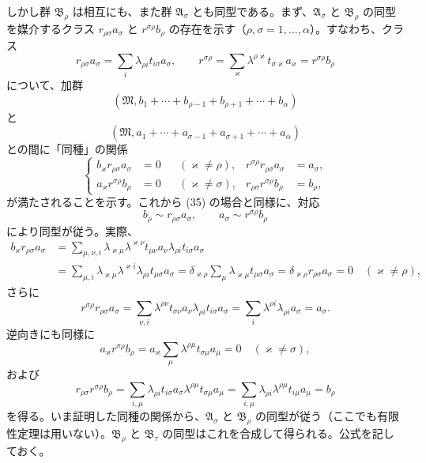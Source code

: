 \documentclass[11pt]{article}
\begin{document}
しかし群 $\mathfrak B_\rho$ は相互にも、また群 $\mathfrak A_\sigma$ とも同型である。まず、$\mathfrak A_\sigma$ と $\mathfrak B_\rho$ の同型を媒介するクラス $r_{\rho\sigma}a_\sigma$ と $r^{\sigma\rho}b_\rho$ の存在を示す（$\rho,\sigma=1,\ldots,\alpha$）。すなわち、クラス
\[
 r_{\rho\sigma}a_\sigma=\sum_i\lambda_{\rho i}t_{i\sigma}a_\sigma,
 \qquad
 r^{\sigma\rho}=\sum_\varkappa\lambda^{\rho\varkappa}t_{\sigma\varkappa}a_\varkappa
 =r^{\sigma\rho}b_\rho
\]
について、加群
\[
 (\mathfrak M,b_1+\cdots+b_{\rho-1}+b_{\rho+1}+\cdots+b_\alpha)
\]
と
\[
 (\mathfrak M,a_1+\cdots+a_{\sigma-1}+a_{\sigma+1}+\cdots+a_\alpha)
\]
との間に「同種」の関係
\begin{equation}
\left\{
\begin{aligned}
 b_\varkappa r_{\rho\sigma}a_\sigma&=0 &&(\varkappa\ne\rho),&
 r^{\sigma\rho}r_{\rho\sigma}a_\sigma&=a_\sigma,\\
 a_\varkappa r^{\sigma\rho}b_\rho&=0 &&(\varkappa\ne\sigma),&
 r_{\rho\sigma}r^{\sigma\rho}b_\rho&=b_\rho,
\end{aligned}\right.
\tag{39}
\end{equation}
が満たされることを示す。これから (35) の場合と同様に、対応
\begin{equation}
 b_\rho\sim r_{\rho\sigma}a_\sigma,
 \qquad
 a_\sigma\sim r^{\sigma\rho}b_\rho
\tag{40}
\end{equation}
により同型が従う。実際、
\[
\begin{aligned}
 b_\varkappa r_{\rho\sigma}a_\sigma
 &=\sum_{\mu,\nu,i}\lambda_{\varkappa\mu}\lambda^{\varkappa\nu}t_{\mu\nu}a_\nu\lambda_{\rho i}t_{i\sigma}a_\sigma\\
 &=\sum_{\mu,i}\lambda_{\varkappa\mu}\lambda^{\varkappa i}\lambda_{\rho i}t_{\mu\sigma}a_\sigma
 =\delta_{\varkappa\rho}\sum_\mu\lambda_{\varkappa\mu}t_{\mu\sigma}a_\sigma
 =\delta_{\varkappa\rho}r_{\rho\sigma}a_\sigma=0\quad(\varkappa\ne\rho),
\end{aligned}
\]
さらに
\[
 r^{\sigma\rho}r_{\rho\sigma}a_\sigma
 =\sum_{\nu,i}\lambda^{\rho\nu}t_{\sigma\nu}a_\nu\lambda_{\rho i}t_{i\sigma}a_\sigma
 =\sum_i\lambda^{\rho i}\lambda_{\rho i}a_\sigma=a_\sigma.
\]
逆向きにも同様に
\[
 a_\varkappa r^{\sigma\rho}b_\rho
 =a_\varkappa\sum_\mu\lambda^{\rho\mu}t_{\sigma\mu}a_\mu=0
 \quad(\varkappa\ne\sigma),
\]
および
\[
 r_{\rho\sigma}r^{\sigma\rho}b_\rho
 =\sum_{i,\mu}\lambda_{\rho i}t_{i\sigma}a_\sigma\lambda^{\rho\mu}t_{\sigma\mu}a_\mu
 =\sum_{i,\mu}\lambda_{\rho i}\lambda^{\rho\mu}t_{i\mu}a_\mu=b_\rho
\]
を得る。いま証明した同種の関係から、$\mathfrak A_\sigma$ と $\mathfrak B_\rho$ の同型が従う（ここでも有限性定理は用いない）。$\mathfrak B_\rho$ と $\mathfrak B_\tau$ の同型はこれを合成して得られる。公式を記しておく。
\end{document}
